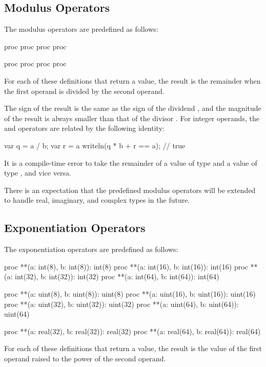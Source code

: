 \subsection{Modulus Operators}
\label{Modulus_Operators}

The modulus operators are predefined as follows:
\begin{chapel}
proc %
proc %
proc %
proc %

proc %
proc %
proc %
proc %
\end{chapel}
For each of these definitions that return a value, the result is the
remainder when the first operand is divided by the second operand.

The sign of the result is the same as the sign of the dividend , and the
magnitude of the result is always smaller than that of the divisor .
For integer operands, the \chpl{\%} and \chpl{/} operators are related by the
following identity:
\begin{chapel}
var q = a / b;
var r = a %
writeln(q * b + r == a);    // true
\end{chapel}

It is a compile-time error to take the remainder of a value of
type  and a value of type , and vice
versa.

There is an expectation that the predefined modulus operators will be
extended to handle real, imaginary, and complex types in the future.

\subsection{Exponentiation Operators}
\label{Exponentiation_Operators}

The exponentiation operators are predefined as follows:
\begin{chapel}
proc **(a: int(8), b: int(8)): int(8)
proc **(a: int(16), b: int(16)): int(16)
proc **(a: int(32), b: int(32)): int(32)
proc **(a: int(64), b: int(64)): int(64)

proc **(a: uint(8), b: uint(8)): uint(8)
proc **(a: uint(16), b: uint(16)): uint(16)
proc **(a: uint(32), b: uint(32)): uint(32)
proc **(a: uint(64), b: uint(64)): uint(64)

proc **(a: real(32), b: real(32)): real(32)
proc **(a: real(64), b: real(64)): real(64)
\end{chapel}
For each of these definitions that return a value, the result is the
value of the first operand raised to the power of the second operand.

